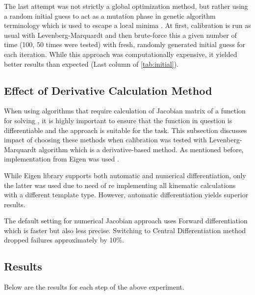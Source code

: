 \documentclass[english, printversion, nomenclature, notitle]{tuvisionthesis} %
\begin{document}
The last attempt was not strictly a global optimization method, but rather using a random initial guess to act as a mutation phase in genetic algorithm terminology which is used to escape a local minima \cite{bouchouicha2003non}. At first, calibration is run as usual with Levenberg-Marquardt and then brute-force this a given number of time (100, 50 times were tested) with fresh, randomly generated initial guess for each iteration. While this approach was computationally expensive, it yielded better results than expected (Last column of \cref{tab:initial}).

\subsection{Effect of Derivative Calculation Method}
When using algorithms that require calculation of Jacobian matrix of a function for solving \cite{lev-mar}, it is highly important to ensure that the function in question is differentiable and the approach is suitable for the task. This subsection discusses impact of choosing these methods when calibration was tested with Levenberg-Marquardt algorithm which is a derivative-based method. As mentioned before, implementation from Eigen was used \cite{eigenweb}.

While Eigen library supports both automatic and numerical differentiation, only the latter was used due to need of re implementing all kinematic calculations with a different template type. However, automatic differentiation yields superior results.

The default setting for numerical Jacobian approach uses Forward differentiation which is faster but also less precise. Switching to Central Differentiation method dropped failures approximately by 10\%.

\subsection{Results}

Below are the results for each step of the above experiment.
\end{document}
